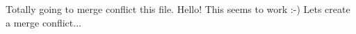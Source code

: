 Totally going to merge conflict this file.
Hello!
This seems to work :-)
Lets create a merge conflict...